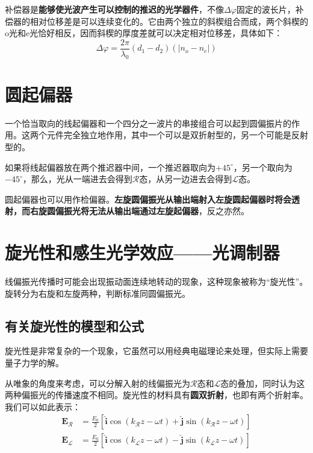 \documentclass[UTF8]{ctexart}
\newcommand{\backdoc}{\normalsize}
\begin{document}
	\backdoc
	补偿器是\textbf{能够使光波产生可以控制的推迟的光学器件}，不像$\Delta \varphi$固定的波长片，补偿器的相对位移差是可以连续变化的。它由两个独立的斜楔组合而成，两个斜楔的o光和e光恰好相反，因而斜楔的厚度差就可以决定相对位移差，具体如下：
	\begin{equation}
\Delta \varphi=\frac{2 \pi}{\lambda_{0}}\left(d_{1}-d_{2}\right)\left(\left|n_{o}-n_{e}\right|\right)
	\end{equation}
	
	\section{圆起偏器}
	一个恰当取向的线起偏器和一个四分之一波片的串接组合可以起到圆偏振片的作用。这两个元件完全独立地作用，其中一个可以是双折射型的，另一个可能是反射型的。
	
	如果将线起偏器放在两个推迟器中间，一个推迟器取向为$+45^{\circ}$，另一个取向为$-45^{\circ}$，那么，光从一端进去会得到$\mathscr{R}$态，从另一边进去会得到$\mathscr{L}$态。
	
	圆起偏器也可以用作检偏器。\textbf{左旋圆偏振光从输出端射入左旋圆起偏器时将会透射，而右旋圆偏振光将无法从输出端通过左旋起偏器}，反之亦然。
	
	\section{旋光性和感生光学效应——光调制器}
	线偏振光传播时可能会出现振动面连续地转动的现象，这种现象被称为“旋光性”。旋转分为右旋和左旋两种，判断标准同圆偏振光。
	
	\subsection{有关旋光性的模型和公式}
	
	\backdoc
	旋光性是非常复杂的一个现象，它虽然可以用经典电磁理论来处理，但实际上需要量子力学的解。
	
	从唯象的角度来考虑，可以分解入射的线偏振光为$\mathscr{R}$态和$\mathscr{L}$态的叠加，同时认为这两种偏振光的传播速度不相同。旋光性的材料具有\textbf{圆双折射}，也即有两个折射率。我们可以如此表示：
	\begin{equation}
	\begin{aligned}
	\mathbf{E}_{\mathscr{R}}&=\frac{E_{0}}{2}\left[\hat{\mathbf{i}} \cos \left(k_{\mathscr{R}} z-\omega t\right)+\hat{\mathbf{j}} \sin \left(k_{\mathscr{R}} z-\omega t\right)\right]\\
	\mathbf{E}_{\mathscr{L}}&=\frac{E_{0}}{2}\left[\hat{\mathbf{i}} \cos \left(k_{\mathscr{L}} z-\omega t\right)-\hat{\mathbf{j}} \sin \left(k_{\mathscr{L}} z-\omega t\right)\right]
	\end{aligned} 
	\end{equation}
	
\end{document}
